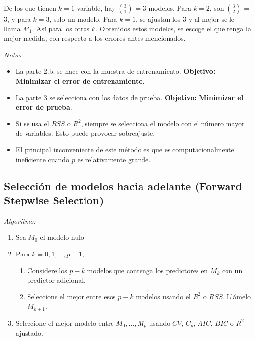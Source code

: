 \documentclass[
  12pt,
]{book}
\providecommand{\tightlist}{%
  \setlength{\itemsep}{0pt}\setlength{\parskip}{0pt}}
\theoremstyle{definition}
\theoremstyle{definition}
\theoremstyle{definition}
\theoremstyle{definition}
\theoremstyle{remark}
\begin{document}
De los que tienen \(k=1\) variable, hay \(\binom{3}{1}\) = 3 modelos. Para \(k=2\), son \(\binom{3}{2}\) = 3, y para \(k=3\), solo un modelo. Para \(k=1\), se ajustan los 3 y al mejor se le llama \(M_1\). Así para los otros \(k\). Obtenidos estos modelos, se escoge el que tenga la mejor medida, con respecto a los errores antes mencionados.

\emph{Notas:}

\begin{itemize}
\tightlist
\item
  La parte 2.b. se hace con la muestra de entrenamiento. \textbf{Objetivo: Minimizar el error de entrenamiento.}
\item
  La parte 3 se selecciona con los datos de prueba. \textbf{Objetivo: Minimizar el error de prueba}.
\item
  Si se usa el \(RSS\) o \(R^2\), siempre se selecciona el modelo con el número mayor de variables. Esto puede provocar sobreajuste.
\item
  El principal inconveniente de este método es que es computacionalmente ineficiente cuando \(p\) es relativamente grande.
\end{itemize}

\hypertarget{selecciuxf3n-de-modelos-hacia-adelante-forward-stepwise-selection}{%
\subsection{\texorpdfstring{Selección de modelos hacia adelante (\textbf{Forward Stepwise Selection})}{Selección de modelos hacia adelante (Forward Stepwise Selection)}}\label{selecciuxf3n-de-modelos-hacia-adelante-forward-stepwise-selection}}

\emph{Algoritmo:}

\begin{enumerate}
\def\labelenumi{\arabic{enumi}.}
\tightlist
\item
  Sea \(M_0\) el modelo nulo.
\item
  Para \(k=0,1,\dots,p-1\),

  \begin{enumerate}
  \def\labelenumii{\alph{enumii}.}
  \tightlist
  \item
    Considere los \(p-k\) modelos que contenga los predictores en \(M_k\) con un predictor adicional.
  \item
    Seleccione el mejor entre esos \(p-k\) modelos usando el \(R^2\) o \(RSS\). Llámelo \(M_{k+1}\).
  \end{enumerate}
\item
  Seleccione el mejor modelo entre \(M_0,\dots, M_p\) usando \(CV\), \(C_p\), \(AIC\), \(BIC\) o \(R^2\) ajustado.
\end{enumerate}
\end{document}
